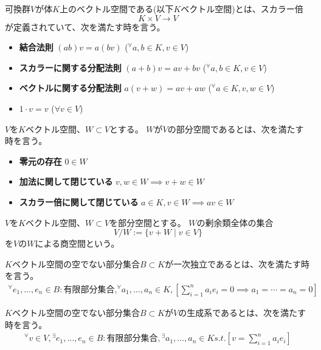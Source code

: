 \begin{definition}[ベクトル空間]
  可換群$V$が体$K$上のベクトル空間である(以下$K$ベクトル空間)とは、スカラー倍
  \[
    K\times V\to V
  \]
  が定義されていて、次を満たす時を言う。
  \begin{itemize}
    \item \textbf{結合法則} $(ab)v=a(bv)$ (${}^\forall a,b\in K, v\in V$)
    \item \textbf{スカラーに関する分配法則} $(a+b)v=av+bv$ (${}^\forall a,b\in K, v\in V$)
    \item \textbf{ベクトルに関する分配法則} $a(v+w)=av+aw$ (${}^\forall a\in K, v,w\in V$)
    \item $1\cdot v=v$ ($\forall v\in V$)
  \end{itemize}
\end{definition}
\begin{definition}[部分空間]
  $V$を$K$ベクトル空間、$W\subset V$とする。
  $W$が$V$の部分空間であるとは、次を満たす時を言う。
  \begin{itemize}
    \item \textbf{零元の存在} $0\in W$
    \item \textbf{加法に関して閉じている} $v,w\in W\implies v+w\in W$
    \item \textbf{スカラー倍に関して閉じている} $a\in K, v\in W\implies av\in W$
  \end{itemize}
\end{definition}
\begin{definition}[商空間]
  $V$を$K$ベクトル空間、$W\subset V$を部分空間とする。
  $W$の剰余類全体の集合
  \[
    V/W:=\{v+W\mid v\in V\}
  \]
  を$V$の$W$による商空間という。
\end{definition}
\begin{definition}[一次独立]
  $K$ベクトル空間の空でない部分集合$B\subset K$が一次独立であるとは、次を満たす時を言う。
  \begin{align*}
    {}^\forall e_1,\dots,e_n\in B: \text{有限部分集合,} {}^\forall a_1,\dots,a_n\in K, \left[\sum_{i=1}^na_ie_i=0\implies a_1=\cdots=a_n=0\right]
  \end{align*}
\end{definition}
\begin{definition}[生成系]
  $K$ベクトル空間の空でない部分集合$B\subset K$が$V$の生成系であるとは、次を満たす時を言う。
  \begin{align*}
    {}^\forall v\in V, {}^\exists e_1,\dots,e_n\in B: \text{有限部分集合}, {}^\exists a_1,\dots,a_n\in K s.t. \left[v=\sum_{i=1}^na_ie_i\right]
  \end{align*}
\end{definition}
